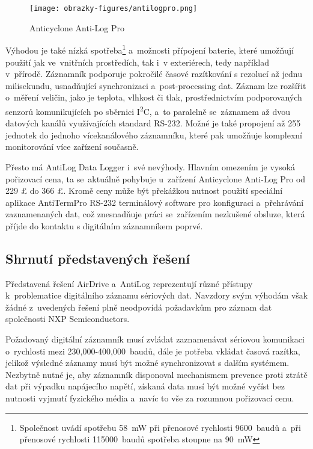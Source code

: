\begin{figure}[h]
    \centering
    \texttt{[image: obrazky-figures/antilogpro.png]}
    
    \caption{Anticyclone Anti-Log Pro~\cite{anticyclone_systems_antilog_pro_price}}
    \label{fig:antilog-pro}
\end{figure}

Výhodou je také nízká spotřeba\footnote{Společnost uvádí spotřebu \SI{58}{\milli\watt} při přenosové rychlosti 9600~baudů a~při přenosové rychlosti 115000~baudů spotřeba stoupne na \SI{90}{\milli\watt}} a~možnosti přípojení baterie, které umožňují použití jak ve~vnitřních prostředích, tak i~v exteriérech, tedy například v~přírodě. Záznamník podporuje pokročilé časové razítkování s rezolucí až jednu milisekundu, usnadňující synchronizaci a~post-processing dat. Záznam lze rozšířit o~měření veličin, jako je teplota, vlhkost či tlak, prostřednictvím podporovaných senzorů komunikujících po sběrnici I\textsuperscript{2}C, a~to paralelně se~záznamem až dvou datových kanálů využívajících standard RS-232. Možné je také propojení až 255 jednotek do jednoho vícekanálového záznamníku, které pak umožňuje komplexní monitorování více zařízení současně.~\cite{anticyclone_systems_antilog_pro, anticyclone_systems_antilog_pro_extended_logging}

Přesto má AntiLog Data Logger i~své nevýhody. Hlavním omezením je vysoká pořizovací cena, ta se~aktuálně pohybuje u~zařízení Anticyclone Anti-Log Pro od 229 £ do 366 £. Kromě ceny může být překážkou nutnost použití speciální aplikace AntiTermPro RS-232 terminálový software pro konfiguraci a~přehrávání zaznamenaných dat, což znesnadňuje práci se~zařízením nezkušené obsluze, která příjde do kontaktu s digitálním záznamníkem poprvé.~\cite{anticyclone_systems_antilog_pro, anticyclone_systems_antilog_pro_price}

\subsection{Shrnutí představených řešení}

Představená řešení AirDrive a~AntiLog reprezentují různé přístupy k~problematice digitálního záznamu sériových dat. Navzdory svým výhodám však žádné z~uvedených řešení plně neodpovídá požadavkům pro záznam dat společnosti NXP Semiconductors. 

Požadovaný digitální záznamník musí zvládat zaznamenávat sériovou komunikaci o~rychlosti mezi 230,000-400,000~baudů, dále je potřeba vkládat časová razítka, jelikož výsledné záznamy musí být možné synchronizovat s dalším systémem. Nezbytně nutné je, aby záznamník disponoval mechanismem prevence proti ztrátě dat při výpadku napájecího napětí, získaná data musí být možné vyčíst bez nutnosti vyjmutí fyzického média a~navíc to vše za rozumnou pořizovací cenu.

